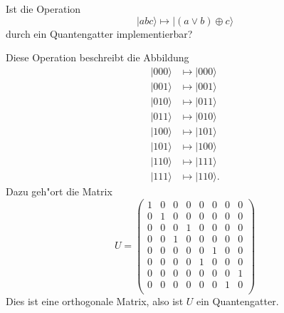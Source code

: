 Ist die Operation
\[
|abc\rangle\mapsto |(a\vee b)\oplus c\rangle
\]
durch ein Quantengatter implementierbar?

\begin{loesung}
Diese Operation beschreibt die Abbildung
\begin{align*}
|000\rangle&\mapsto|000\rangle\\
|001\rangle&\mapsto|001\rangle\\
|010\rangle&\mapsto|011\rangle\\
|011\rangle&\mapsto|010\rangle\\
|100\rangle&\mapsto|101\rangle\\
|101\rangle&\mapsto|100\rangle\\
|110\rangle&\mapsto|111\rangle\\
|111\rangle&\mapsto|110\rangle.
\end{align*}
Dazu geh"ort die Matrix
\[
U
=
\begin{pmatrix}
1&0&0&0&0&0&0&0\\
0&1&0&0&0&0&0&0\\
0&0&0&1&0&0&0&0\\
0&0&1&0&0&0&0&0\\
0&0&0&0&0&1&0&0\\
0&0&0&0&1&0&0&0\\
0&0&0&0&0&0&0&1\\
0&0&0&0&0&0&1&0\\
\end{pmatrix}
\]
Dies ist eine orthogonale Matrix, also ist $U$ ein Quantengatter.
\end{loesung}


